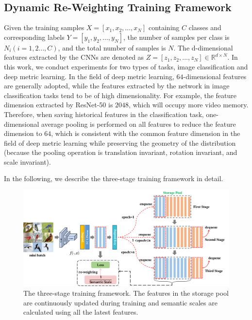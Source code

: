 \documentclass[10pt]{article} %
\begin{document}
\subsection{Dynamic Re-Weighting Training Framework\label{D.2}}



Given the training samples $X = \left[ {{x_1},{x_2},\ldots,{x_N}} \right]$ containing $C$ classes and corresponding labels $Y = \left[ {{y_1},{y_2},\ldots,{y_N}} \right]$, the number of samples per class is ${N_i}\left( {i = 1,2 \ldots ,C} \right)$, and the total number of samples is $N$. The d-dimensional features extracted by the CNNs are denoted as $Z = \left[ {{z_1},{z_2},\ldots,{z_N}} \right] \in {\mathbb{R}^{d \times N}}$. In this work, we conduct experiments for two types of tasks, image classification and deep metric learning. In the field of deep metric learning, $64$-dimensional features are generally adopted, while the features extracted by the network in image classification tasks tend to be of high dimensionality. For example, the feature dimension extracted by ResNet-50 is $2048$, which will occupy more video memory. Therefore, when saving historical features in the classification task, one-dimensional average pooling is performed on all features to reduce the feature dimension to $64$, which is consistent with the common feature dimension in the field of deep metric learning while preserving the geometry of the distribution (because the pooling operation is translation invariant, rotation invariant, and scale invariant).

In the following, we describe the three-stage training framework in detail.



\begin{figure}[h] %
\begin{center}
\includegraphics[width=1\columnwidth]{fig7}
\vskip -0.05in
\caption{The three-stage training framework. The features in the storage pool are continuously updated during training and semantic scales are calculated using all the latest features.}
\label{fig7}
\end{center}
\vskip -0.1in
\end{figure}
\end{document}
